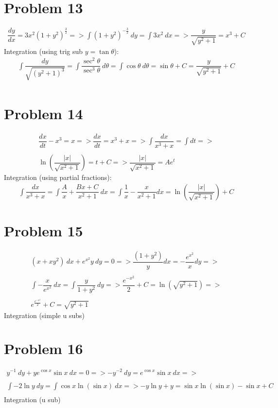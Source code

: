 \documentclass[12pt]{exam}
\begin{document}
\section*{Problem 13}
\large\begin{eqnarray*}
    \dfrac{dy}{dx}=3x^2(1+y^2)^\frac{3}{2}=>\int(1+y^2)^{-\frac{3}{2}}\:dy=\int3x^2\:dx=>\dfrac{y}{\sqrt{y^2+1}}=x^3+C
\end{eqnarray*}
Integration (using trig sub $y=\tan{\theta}$):
\large\begin{eqnarray*}
    \int\dfrac{dy}{\sqrt{(y^2+1)^3}}=\int\dfrac{\sec^2{\theta}}{\sec^3\theta}\:d\theta=\int\cos{\theta}\:d\theta=\sin{\theta}+C=\dfrac{y}{\sqrt{y^2+1}}+C\\
\end{eqnarray*}
\section*{Problem 14}
\large\begin{eqnarray*}
    \dfrac{dx}{dt}-x^3=x=>\dfrac{dx}{dt}=x^3+x=>\int\dfrac{dx}{x^3+x}=\int dt=>\\\\
    \ln{\left(\dfrac{|x|}{\sqrt{x^2+1}}\right)}=t+C=>\dfrac{|x|}{\sqrt{x^2+1}}=Ae^t
\end{eqnarray*}
Integration (using partial fractions):
\large\begin{eqnarray*}
    \int\dfrac{dx}{x^3+x}=\int\dfrac{A}{x}+\dfrac{Bx+C}{x^2+1}\:dx=\int\dfrac{1}{x}-\dfrac{x}{x^2+1}dx=\ln{\left(\dfrac{|x|}{\sqrt{x^2+1}}\right)}+C
\end{eqnarray*}
\section*{Problem 15}
\large\begin{eqnarray*}
    (x+xy^2)\:dx+e^{x^2}y\:dy=0=>\dfrac{(1+y^2)}{y}dx=-\dfrac{e^{x^2}}{x}dy=>\\\\
    \int-\dfrac{x}{e^{x^2}}\:dx=\int\dfrac{y}{1+y^2}\:dy=>\dfrac{e^{-x^2}}{2}+C=\ln{\left(\sqrt{y^2+1}\right)}=>\\\\
    e^{\frac{e^{-x^2}}{2}}+C=\sqrt{y^2+1}
\end{eqnarray*}
Integration (simple u subs)
\section*{Problem 16}
\large\begin{eqnarray*}
    y^{-1}\:dy+ye^{\cos{x}}\sin{x}\:dx=0=>-y^{-2}\:dy=e^{\cos{x}}\sin{x}\:dx=>\\\\
    \int-2\ln{y}\:dy=\int\cos{x}\ln{(\sin{x})}\:dx=>-y\ln{y}+y=\sin{x}\ln{(\sin{x})}-\sin{x}+C\\
\end{eqnarray*}
Integration (u sub)
\end{document}
